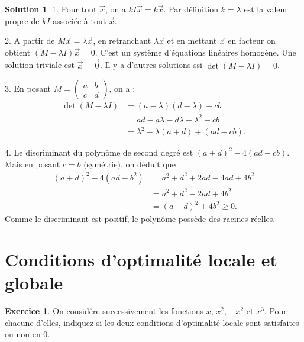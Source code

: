 \documentclass[a4paper,francais]{article}
\theoremstyle{definition}
\newtheorem{exercice}{Exercice}[section]
\newtheorem*{solution}{Solution}
\begin{document}
\begin{solution}
  1. Pour tout $\vec{x}$, on a $kI\vec{x} = k \vec{x}$. Par définition $k = \lambda$
  est la valeur propre de $kI$ associée à tout $\vec{x}$. 
  
  2. A partir de  $M\vec{x} = \lambda \vec{x}$, en retranchant $\lambda \vec{x}$ et en mettant
  $\vec{x}$ en facteur on obtient $(M - \lambda I) \vec{x} = 0$. C'est un système
  d'équations linéaires homogène. Une solution triviale est $\vec{x} = \vec{0}$.
  Il y a d'autres solutions ssi $\det{(M - \lambda I)} = 0$. 

  3. En posant $M = \begin{pmatrix} a & b \\ c & d \end{pmatrix}$, on a :
  \begin{align*}
    \det{(M - \lambda I)} &=
    (a-\lambda)(d - \lambda) - cb \\
    &= ad - a\lambda - d\lambda + \lambda^2 - cb \\
    &= \lambda^2 - \lambda(a+d) + (ad -cb).
  \end{align*}

  4. Le discriminant du polynôme de second degré est $(a+d)^2 - 4(ad-cb)$.
  Mais en posant $c=b$ (symétrie), on déduit que
  \begin{align*}
    (a+d)^2 - 4(ad-b^2) &=
    a^2 + d^2 + 2ad - 4ad + 4b^2 \\
    &= a^2 + d^2 - 2ad + 4b^2 \\
    &= (a-d)^2 + 4b^2 \geq 0.
  \end{align*}
  Comme le discriminant est positif, le polynôme possède des racines réelles.%
\end{solution}

\section{Conditions d'optimalité locale et globale}
\label{sec:opt-loc}

\begin{exercice}
  On considère successivement les fonctions $x$, $x^2$, $-x^2$ et $x^3$.
  Pour chacune d'elles, indiquez si les deux conditions d'optimalité
  locale sont satisfaites ou non en $0$.
\end{exercice}
\end{document}
